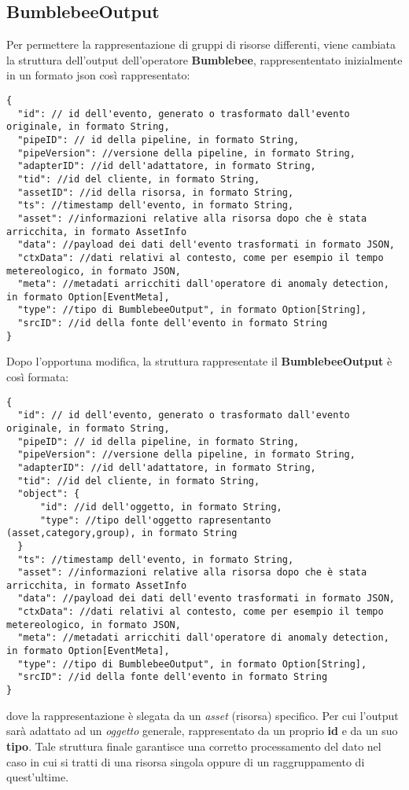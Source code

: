 \subsection{BumblebeeOutput}\label{sec:bbout}
Per permettere la rappresentazione di gruppi di risorse differenti, viene cambiata la struttura dell'output dell'operatore \textbf{Bumblebee}, rappresententato inizialmente in un formato \gls{json} così rappresentato:

\begin{verbatim}
{
  "id": // id dell'evento, generato o trasformato dall'evento originale, in formato String,
  "pipeID": // id della pipeline, in formato String,
  "pipeVersion": //versione della pipeline, in formato String,
  "adapterID": //id dell'adattatore, in formato String,
  "tid": //id del cliente, in formato String,
  "assetID": //id della risorsa, in formato String,
  "ts": //timestamp dell'evento, in formato String,
  "asset": //informazioni relative alla risorsa dopo che è stata arricchita, in formato AssetInfo
  "data": //payload dei dati dell'evento trasformati in formato JSON,
  "ctxData": //dati relativi al contesto, come per esempio il tempo metereologico, in formato JSON,
  "meta": //metadati arricchiti dall'operatore di anomaly detection, in formato Option[EventMeta],
  "type": //tipo di BumblebeeOutput", in formato Option[String],
  "srcID": //id della fonte dell'evento in formato String
}
\end{verbatim}

Dopo l'opportuna modifica, la struttura rappresentate il \textbf{BumblebeeOutput} è così formata:

\begin{verbatim}
{
  "id": // id dell'evento, generato o trasformato dall'evento originale, in formato String,
  "pipeID": // id della pipeline, in formato String,
  "pipeVersion": //versione della pipeline, in formato String,
  "adapterID": //id dell'adattatore, in formato String,
  "tid": //id del cliente, in formato String,
  "object": {
	  "id": //id dell'oggetto, in formato String,
	  "type": //tipo dell'oggetto rapresentanto (asset,category,group), in formato String
  }
  "ts": //timestamp dell'evento, in formato String,
  "asset": //informazioni relative alla risorsa dopo che è stata arricchita, in formato AssetInfo
  "data": //payload dei dati dell'evento trasformati in formato JSON,
  "ctxData": //dati relativi al contesto, come per esempio il tempo metereologico, in formato JSON,
  "meta": //metadati arricchiti dall'operatore di anomaly detection, in formato Option[EventMeta],
  "type": //tipo di BumblebeeOutput", in formato Option[String],
  "srcID": //id della fonte dell'evento in formato String
}
\end{verbatim}
dove la rappresentazione è slegata da un \textit{asset} (risorsa) specifico. Per cui l'output sarà adattato ad un \textit{oggetto} generale, rappresentato da un proprio \textbf{id} e da un suo \textbf{tipo}.
Tale struttura finale garantisce una corretto processamento del dato nel caso in cui si tratti di una risorsa singola oppure di un raggruppamento di quest'ultime.
